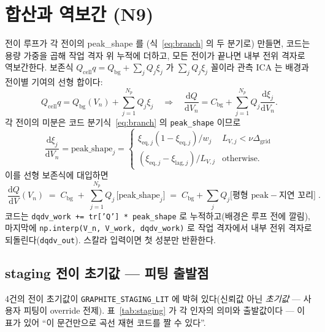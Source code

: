 \documentclass[11pt,a4paper]{article}
\newcommand{\dd}{\mathrm{d}}
\newcommand{\eq}{\mathrm{eq}}
\newcommand{\cell}{\mathrm{cell}}
\newcommand{\bg}{\mathrm{bg}}
\newcommand{\code}[1]{\texttt{#1}}
\begin{document}
\section{합산과 역보간 (N9)}\label{sec:sum}
전이 루프가 각 전이의 peak\_shape 를 (식~\eqref{eq:branch} 의 두 분기로) 만들면, 코드는 용량 가중을 곱해 작업 격자 위
누적에 더하고, 모든 전이가 끝나면 내부 전위 격자로 역보간한다. 보존식 $Q_\cell q=Q_\bg+\sum_jQ_j\xi_j$ 가
$\sum_jQ_j\xi_j$ 꼴이라 관측 ICA 는 배경과 전이별 기여의 선형 합이다:
\begin{equation}
Q_\cell q=Q_\bg(V_n)+\sum_{j=1}^{N_p}Q_j\xi_j
\quad\Longrightarrow\quad
\frac{\dd Q}{\dd V_n}
=C_\bg+\sum_{j=1}^{N_p}Q_j\frac{\dd\xi_j}{\dd V_n}.
\label{eq:sumderiveA}
\end{equation}
각 전이의 미분은 코드 분기식~\eqref{eq:branch} 의 \code{peak\_shape} 이므로
\begin{equation}
\frac{\dd\xi_j}{\dd V_n}
=\text{peak\_shape}_j
=
\begin{cases}
\xi_{\eq,j}(1-\xi_{\eq,j})/w_j & L_{V,j}<\nu\Delta_\mathrm{grid}\\
(\xi_{\eq,j}-\xi_{\mathrm{lag},j})/L_{V,j} & \text{otherwise}.
\end{cases}
\label{eq:sumderiveB}
\end{equation}
이를 선형 보존식에 대입하면
\begin{equation}
\boxed{\;\frac{\dd Q}{\dd V}(V_n)\;=\;C_\bg\;+\;\sum_{j=1}^{N_p}Q_j\,
\big[\text{peak\_shape}_j\big]
\;=\;C_\bg+\sum_jQ_j\big[\text{평형 peak}-\text{지연 꼬리}\big]\;.}
\label{eq:sum}
\end{equation}
코드는 \code{dqdv\_work += tr['Q'] * peak\_shape} 로 누적하고(배경은 루프 전에 깔림), 마지막에
\code{np.interp(V\_n, V\_work, dqdv\_work)} 로 작업 격자에서 내부 전위 격자로 되돌린다(\code{dqdv\_out}).
스칼라 입력이면 첫 성분만 반환한다.

\subsection{staging 전이 초기값 — 피팅 출발점}
4건의 전이 초기값이 \code{GRAPHITE\_STAGING\_LIT} 에 박혀 있다(신뢰값 아닌 \emph{초기값} — 사용자 피팅이 override
전제). 표~\ref{tab:staging} 가 각 인자의 의미와 출발값이다 — 이 표가 있어 ``이 문건만으로 곡선 재현 코드를 짤 수 있다''.
\end{document}
